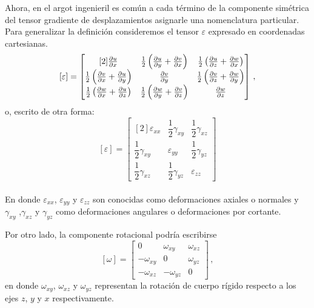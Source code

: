 \documentclass[../notas medios.tex]{subfiles}
\begin{document}
Ahora, en el argot ingenieril es común a cada término de la componente 
simétrica del tensor gradiente de desplazamientos asignarle una nomenclatura 
particular. Para generalizar la definición consideremos el tensor $\varepsilon$ 
expresado en coordenadas cartesianas.
\[	
[\varepsilon] =
\begin{bmatrix}[2]
  \pdv{u}{x} & \frac{1}{2} \left(\pdv{u}{y} + \pdv{v}{x}\right)
  & \frac{1}{2} \left(\pdv{u}{z} + \pdv{w}{x}\right) \\
  \frac{1}{2} \left(\pdv{v}{x} + \pdv{u}{y}\right)  & \pdv{v}{y}
  & \frac{1}{2}	\left(\pdv{v}{z} + \pdv{w}{y}\right) \\
  \frac{1}{2} \left(\pdv{w}{x} + \pdv{u}{z}\right) & \frac{1}{2} 
  \left(\pdv{w}{y} + \pdv{v}{z}\right)  & \pdv{w}{z}
\end{bmatrix}\, ,\]
o, escrito de otra forma: 
\[	
[\varepsilon] =
\begin{bmatrix}[2]
  \varepsilon_{xx} & \dfrac{1}{2} \gamma_{xy} & \dfrac{1}{2} \gamma_{xz}  \\
  \dfrac{1}{2} \gamma_{xy}  & \varepsilon_{yy} & \dfrac{1}{2}  \gamma_{yz}  \\
  \dfrac{1}{2} \gamma_{xz} & \dfrac{1}{2} \gamma_{yz}  &  \varepsilon_{zz}
\end{bmatrix}\]\\

En donde $\varepsilon_{xx}$, $\varepsilon_{yy}$ y $\varepsilon_{zz}$ son conocidas como deformaciones axiales o normales y  $\gamma_{xy}$ ,$ \gamma_{xz}$  y $\gamma_{yz}$  como deformaciones angulares o deformaciones por cortante. 

Por otro lado, la componente rotacional podría escribirse
\[	
[\omega] =
\begin{bmatrix}
  0 & \omega_{xy}  &  \omega_{xz} \\
  -\omega_{xy}  & 0 &  \omega_{yz} \\
  -\omega_{xz}  & -\omega_{yz}  &  0
\end{bmatrix}\, ,\]
en donde $\omega_{xy}$, $\omega_{xz}$ y  $\omega_{yz}$ representan la rotación 
de cuerpo rígido respecto a los ejes $z$, $y$ y $x$ respectivamente.
\end{document}
